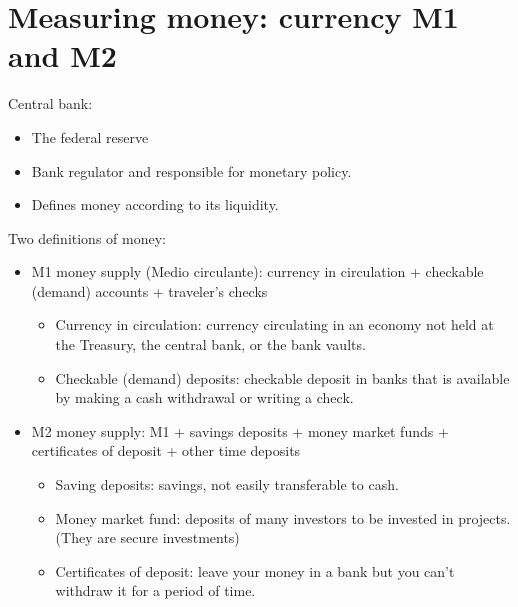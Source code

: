 \documentclass[openany]{book}
\begin{document}
\section{Measuring money: currency M1 and M2}
Central bank: 
\begin{itemize}
    \item The federal reserve 
    \item Bank regulator and responsible for monetary policy. 
    \item Defines money according to its liquidity. 
\end{itemize}
Two definitions of money: 
\begin{itemize}
    \item M1 money supply (Medio circulante): currency in circulation + checkable (demand) accounts + traveler's checks
        \begin{itemize}
            \item Currency in circulation: currency circulating in an economy not held at the Treasury, the central bank, or the bank vaults.
            \item Checkable (demand) deposits: checkable deposit in banks that is available by making a cash withdrawal or writing a check.
        \end{itemize}
    \item M2 money supply: M1 + savings deposits + money market funds + certificates of deposit + other time deposits
        \begin{itemize}
            \item Saving deposits: savings, not easily transferable to cash. 
            \item Money market fund: deposits of many investors to be invested in projects. (They are secure investments)
            \item Certificates of deposit: leave your money in a bank but you can't withdraw it for a period of time. 
        \end{itemize}
\end{itemize}

\end{document}
